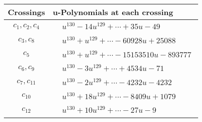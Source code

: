 \documentclass[1p]{elsarticle_modified}
\theoremstyle{definition}
\begin{document}
\begin{tabular}{m{50pt}|m{274pt}}
Crossings & \hspace{64pt}u-Polynomials at each crossing \\
\hline $$\begin{aligned}c_{1},c_{2},c_{4}\end{aligned}$$&$\begin{aligned}
&u^{130}-14 u^{129}+\cdots+35 u-49
\end{aligned}$\\
\hline $$\begin{aligned}c_{3},c_{8}\end{aligned}$$&$\begin{aligned}
&u^{130}+u^{129}+\cdots-60928 u+25088
\end{aligned}$\\
\hline $$\begin{aligned}c_{5}\end{aligned}$$&$\begin{aligned}
&u^{130}+u^{129}+\cdots-15153510 u-893777
\end{aligned}$\\
\hline $$\begin{aligned}c_{6},c_{9}\end{aligned}$$&$\begin{aligned}
&u^{130}-3 u^{129}+\cdots+4534 u-71
\end{aligned}$\\
\hline $$\begin{aligned}c_{7},c_{11}\end{aligned}$$&$\begin{aligned}
&u^{130}-2 u^{129}+\cdots-4232 u-4232
\end{aligned}$\\
\hline $$\begin{aligned}c_{10}\end{aligned}$$&$\begin{aligned}
&u^{130}+18 u^{129}+\cdots-8409 u+1079
\end{aligned}$\\
\hline $$\begin{aligned}c_{12}\end{aligned}$$&$\begin{aligned}
&u^{130}+10 u^{129}+\cdots-27 u-9
\end{aligned}$\\
\hline
\end{tabular}\\~\\
\end{document}
